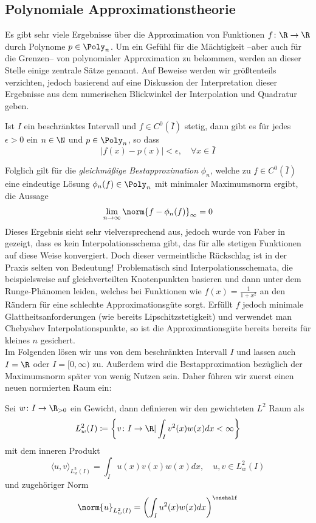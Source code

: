 \subsection{Polynomiale Approximationstheorie}
Es gibt sehr viele Ergebnisse über die Approximation von Funktionen $f\colon \R\to\R$ durch Polynome $p\in\Poly_n$. Um ein Gefühl für die Mächtigkeit --aber auch für die Grenzen-- von polynomialer Approximation zu bekommen, werden an dieser Stelle einige zentrale Sätze genannt. Auf Beweise werden wir größtenteils verzichten, jedoch basierend auf \autocite{Trefethen} eine Diskussion der Interpretation dieser Ergebnisse aus dem numerischen Blickwinkel der Interpolation und Quadratur geben.
\begin{maththeorem}[Weierstrass]
Ist $I$ ein beschränktes Intervall und $f\in C^0(\bar{I})$ stetig, dann gibt es für jedes $\epsilon >0$ ein $n\in\N$ und $p\in\Poly_n$, so dass
\[|f(x)-p(x)|<\epsilon,\quad \forall x\in\bar{I}\]
\end{maththeorem}
Folglich gilt für die \emph{gleichmäßige Bestapproximation} $\phi_n$, welche zu $f\in C^0(\bar{I})$ eine eindeutige Lösung $\phi_n(f)\in\Poly_n$ mit minimaler Maximumsnorm ergibt, die Aussage
\[\lim\limits_{n\to\infty}\norm{f-\phi_n(f)}_\infty=0\] 
Dieses Ergebnis sieht sehr vielversprechend aus, jedoch wurde von Faber in \autocite{faber14} gezeigt, dass es kein Interpolationsschema gibt, das für alle stetigen Funktionen auf diese Weise konvergiert. Doch dieser vermeintliche Rückschlag ist in der Praxis selten von Bedeutung! Problematisch sind Interpolationsschemata, die beispielsweise auf gleichverteilten Knotenpunkten basieren und dann unter dem Runge-Phänomen leiden, welches bei Funktionen wie $f(x)=\frac{1}{1+x^2}$ an den Rändern für eine schlechte Approximationsgüte sorgt. Erfüllt $f$ jedoch minimale Glattheitsanforderungen (wie bereits Lipschitzstetigkeit) und verwendet man Chebyshev Interpolationspunkte, so ist die Approximationsgüte bereits bereits für kleines $n$ gesichert.\\[0.3cm]
Im Folgenden lösen wir uns von dem beschränkten Intervall $I$ und lassen auch $I=\R$ oder $I=[0,\infty)$ zu. Außerdem wird die Bestapproximation bezüglich der Maximumsnorm später von wenig Nutzen sein. Daher führen wir zuerst einen neuen normierten Raum ein:
\begin{mathdef}
Sei $w\colon I\to\R_{>0}$ ein Gewicht, dann definieren wir den gewichteten $L^2$ Raum als
\begin{equation*}
L_w^2(I)\coloneqq \left\lbrace v\colon I\to\R | \int_Iv^2(x)w(x)dx<\infty\right\rbrace
\end{equation*}
mit dem inneren Produkt 
\[\langle u,v\rangle_{L_w^2(I)}=\int_I u(x)v(x)w(x)dx,\quad u,v\in L_w^2(I)\]
und zugehöriger Norm
\[\norm{u}_{L_w^2(I)}=\left(\int_I u^2(x)w(x)dx\right)^{\onehalf}\]
\end{mathdef}
